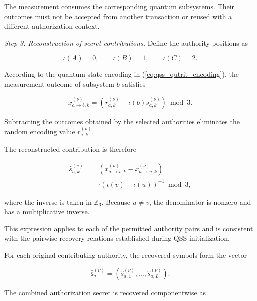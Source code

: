 \documentclass[twocolumn,10pt,journal]{IEEEtran}
\begin{document}
The measurement consumes the corresponding
quantum subsystems. Their outcomes must not be
accepted from another transaction or reused with
a different authorization context.

\textit{Step 3: Reconstruction of secret contributions.}
Define the authority positions as

\begin{equation}
\iota(A)=0,\qquad
\iota(B)=1,\qquad
\iota(C)=2.
\label{eq:qsv2g_authority_positions}
\end{equation}

According to the quantum-state encoding in
(\ref{eq:qss_qutrit_encoding}), the measurement
outcome of subsystem $b$ satisfies

\begin{equation}
x_{a\rightarrow b,k}^{(\nu)}
=
\left(
r_{a,k}^{(\nu)}
+
\iota(b)s_{a,k}^{(\nu)}
\right)\bmod 3.
\label{eq:qsv2g_qss_outcome_relation}
\end{equation}

Subtracting the outcomes obtained by the selected
authorities eliminates the random encoding value
$r_{a,k}^{(\nu)}$.

The reconstructed contribution is therefore

\begin{equation}
\begin{aligned}
\widehat{s}_{a,k}^{(\nu)}
={}&
\left(
x_{a\rightarrow v,k}^{(\nu)}
-
x_{a\rightarrow u,k}^{(\nu)}
\right)\\
&\cdot
\left(
\iota(v)-\iota(u)
\right)^{-1}
\bmod 3,
\end{aligned}
\label{eq:qsv2g_qss_recover_symbol}
\end{equation}

where the inverse is taken in $\mathbb{Z}_3$.
Because $u\neq v$, the denominator is nonzero
and has a multiplicative inverse.

This expression applies to each of the permitted
authority pairs and is consistent with the
pairwise recovery relations established during
QSS initialization.

For each original contributing authority,
the recovered symbols form the vector

\begin{equation}
\widehat{\mathbf{s}}_a^{(\nu)}
=
\left(
\widehat{s}_{a,1}^{(\nu)},
\ldots,
\widehat{s}_{a,L}^{(\nu)}
\right).
\label{eq:qsv2g_recovered_contribution}
\end{equation}

The combined authorization secret is recovered
componentwise as
\end{document}

